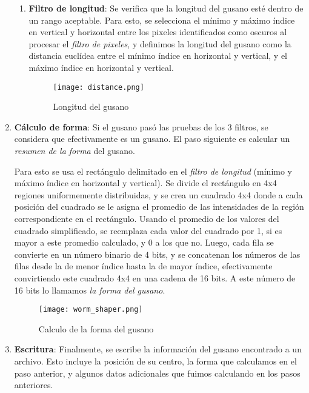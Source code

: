 \documentclass{article}
\begin{document}
\begin{enumerate}
\begin{enumerate}
\item \textbf{Filtro de longitud}: Se verifica que la longitud del gusano esté dentro de un rango aceptable. Para esto, se selecciona el mínimo y máximo índice en vertical y horizontal entre los pixeles identificados como oscuros al procesar el \emph{filtro de pixeles}, y definimos la longitud del gusano como la distancia euclídea entre el mínimo índice en horizontal y vertical, y el máximo índice en horizontal y vertical.
\begin{figure*}[h]
    \centering
    \texttt{[image: distance.png]}
    \caption{Longitud del gusano}
    \label{label_length}
\end{figure*}

\end{enumerate}

\item \textbf{Cálculo de forma}: Si el gusano pasó las pruebas de los 3 filtros, se considera que efectivamente es un gusano. El paso siguiente es calcular un \emph{resumen de la forma} del gusano.

\hspace{0.2cm} Para esto se usa el rectángulo delimitado en el \emph{filtro de longitud} (mínimo y máximo índice en horizontal y vertical). Se divide el rectángulo en 4x4 regiones uniformemente distribuidas, y se crea un cuadrado 4x4 donde a cada posición del cuadrado se le asigna el promedio de las intensidades de la región correspondiente en el rectángulo. Usando el promedio de los valores del cuadrado simplificado, se reemplaza cada valor del cuadrado por 1, si es mayor a este promedio calculado, y 0 a los que no. Luego, cada fila se convierte en un número binario de 4 bits, y se concatenan los números de las filas desde la de menor índice hasta la de mayor índice, efectivamente convirtiendo este cuadrado 4x4 en una cadena de 16 bits. A este número de 16 bits lo llamamos \emph{la forma del gusano}.

\begin{figure*}[h]
    \centering
    \texttt{[image: worm\_shaper.png]}
    \caption{Calculo de la forma del gusano}
    \label{label_wormshape}
\end{figure*}

\item \textbf{Escritura}: Finalmente, se escribe la información del gusano encontrado a un archivo. Esto incluye la posición de su centro, la forma que calculamos en el paso anterior, y algunos datos adicionales que fuimos calculando en los pasos anteriores.
\end{enumerate}
\end{document}
